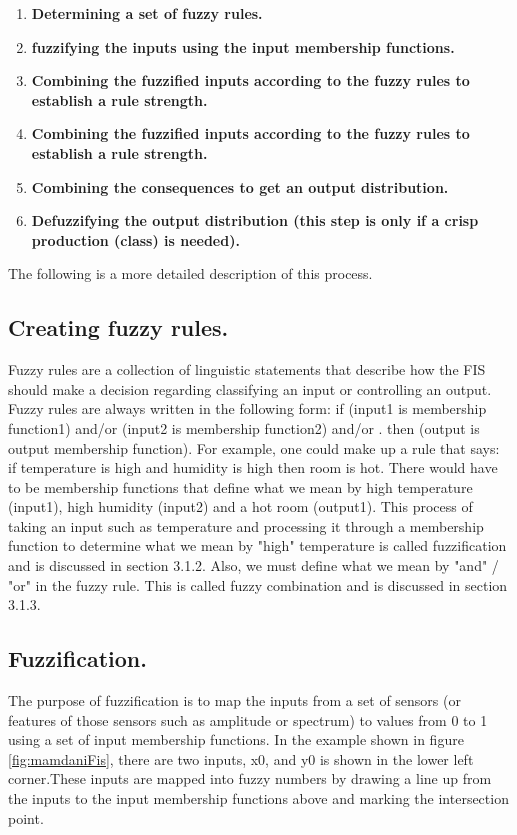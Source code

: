 \begin{enumerate}
\item  \textbf{Determining a set of fuzzy rules.}
\item  \textbf{fuzzifying the inputs using the input membership functions.} 
\item  \textbf{Combining the fuzzified inputs according to the fuzzy rules to establish a rule strength.} 
\item  \textbf{Combining the fuzzified inputs according to the fuzzy rules to establish a rule strength.} 
\item  \textbf{Combining the consequences to get an output distribution.}
\item  \textbf{Defuzzifying the output distribution (this step is only if a crisp production (class) is needed).}
\end{enumerate}

The following is a more detailed description of this process.

\subsection{Creating fuzzy rules.} 

Fuzzy rules are a collection of linguistic
statements that describe how the FIS should make a decision regarding
classifying an input or controlling an output. Fuzzy rules are always written in
the following form: if (input1 is membership function1) and/or (input2 is
membership function2) and/or . then (output is output membership function). For
example, one could make up a rule that says: if temperature is high and humidity
is high then room is hot. There would have to be membership functions that
define what we mean by high temperature (input1), high humidity (input2) and a
hot room (output1). This process of taking an input such as temperature and
processing it through a membership function to determine what we mean by "high"
temperature is called fuzzification and is discussed in section 3.1.2. Also, we
must define what we mean by "and" / "or" in the fuzzy rule. This is called fuzzy
combination and is discussed in section 3.1.3.

\subsection{Fuzzification.}

The purpose of fuzzification is to map the inputs from a set of sensors (or
features of those sensors such as amplitude or spectrum) to values from 0 to 1
using a set of input membership functions. In the example shown in figure \ref{fig:mamdaniFis},
there are two inputs, x0, and y0 is shown in the lower left corner.These inputs
are mapped into fuzzy numbers by drawing a line up from the inputs to the input
membership functions above and marking the intersection point. 

